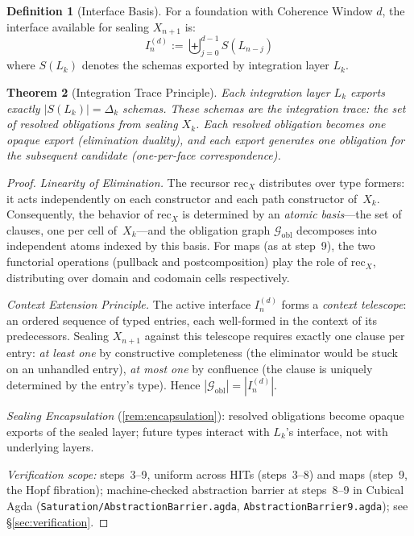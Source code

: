 \documentclass[11pt,a4paper]{article}
\theoremstyle{plain}
\newtheorem{theorem}{Theorem}[section]
\theoremstyle{definition}
\newtheorem{definition}[theorem]{Definition}
\theoremstyle{remark}
\begin{document}
\begin{definition}[Interface Basis]
\label{def:interface}
For a foundation with Coherence Window $d$, the interface available for sealing $X_{n+1}$ is:
\begin{equation}
    I^{(d)}_n := \biguplus_{j=0}^{d-1} S(L_{n-j})
\end{equation}
where $S(L_k)$ denotes the schemas exported by integration layer $L_k$.
\end{definition}

\begin{theorem}[Integration Trace Principle]
\label{lem:trace}
Each integration layer $L_k$ exports exactly $|S(L_k)| = \Delta_k$ schemas.
These schemas are the \emph{integration trace}: the set of resolved obligations from sealing $X_k$.
Each resolved obligation becomes one opaque export (\emph{elimination duality}), and each export generates one obligation for the subsequent candidate (\emph{one-per-face correspondence}).
\end{theorem}

\begin{proof}
\emph{Linearity of Elimination.}
The recursor $\mathrm{rec}_X$ distributes over type formers: it acts independently on each constructor and each path constructor of~$X_k$.
Consequently, the behavior of $\mathrm{rec}_X$ is determined by an \emph{atomic basis}---the set of clauses, one per cell of~$X_k$---and the obligation graph $\mathcal{G}_{\mathrm{obl}}$ decomposes into independent atoms indexed by this basis.
For maps (as at step~9), the two functorial operations (pullback and postcomposition) play the role of $\mathrm{rec}_X$, distributing over domain and codomain cells respectively.

\emph{Context Extension Principle.}
The active interface $I^{(d)}_n$ forms a \emph{context telescope}: an ordered sequence of typed entries, each well-formed in the context of its predecessors.
Sealing $X_{n+1}$ against this telescope requires exactly one clause per entry:
\emph{at least one} by constructive completeness (the eliminator would be stuck on an unhandled entry),
\emph{at most one} by confluence (the clause is uniquely determined by the entry's type).
Hence $|\mathcal{G}_{\mathrm{obl}}| = |I^{(d)}_n|$.

\emph{Sealing Encapsulation} (\cref{rem:encapsulation}): resolved obligations become opaque exports of the sealed layer; future types interact with $L_k$'s interface, not with underlying layers.

\emph{Verification scope:} steps~3--9, uniform across HITs (steps~3--8) and maps (step~9, the Hopf fibration);
machine-checked abstraction barrier at steps~8--9 in Cubical Agda (\texttt{Saturation/\allowbreak AbstractionBarrier.agda}, \texttt{AbstractionBarrier9.agda}); see \S\ref{sec:verification}.
\end{proof}
\end{document}

